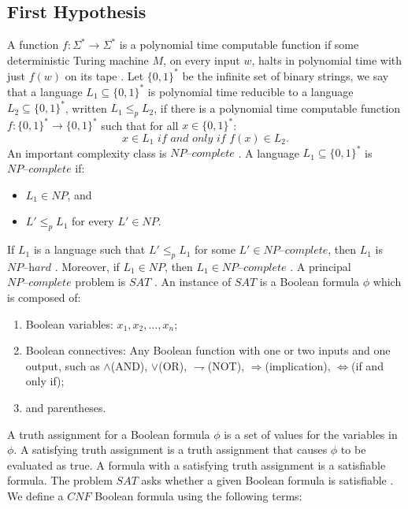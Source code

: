 \documentclass[a4paper,UKenglish,cleveref, autoref]{lipics-v2019}
\begin{document}
\subsection{First Hypothesis}

A function $f : \Sigma^{*} \rightarrow \Sigma^{*}$ is a polynomial time computable function if some deterministic Turing machine $M$, on every input $w$, halts in polynomial time with just $f(w)$ on its tape \cite{MS06}. Let $\{0, 1\}^{*}$ be the infinite set of binary strings, we say that a language $L_{1} \subseteq \{0, 1\}^{*}$ is polynomial time reducible to a language $L_{2} \subseteq \{0, 1\}^{*}$, written $L_{1} \leq_{p} L_{2}$, if there is a polynomial time computable function $f : \{0, 1\}^{*} \rightarrow \{0, 1\}^{*}$ such that for all $x \in \{0, 1\}^{*}$:
\[x \in L_{1} \textit{ if and only if } f(x) \in L_{2}.\]
An important complexity class is $\textit{NP--complete}$ \cite{GJ79}. A language $L_{1} \subseteq \{0, 1\}^{*}$ is $\textit{NP--complete}$ if:

\begin{itemize}
\item $L_{1} \in NP$, and
\item $L' \leq_{p} L_{1}$ for every $L' \in NP$.
\end{itemize}

If $L_{1}$ is a language such that $L' \leq_{p} L_{1}$ for some $L' \in \textit{NP--complete}$, then $L_{1}$ is $\textit{NP--hard}$ \cite{CLRS01}. Moreover, if $L_{1} \in NP$, then $L_{1} \in \textit{NP--complete}$ \cite{CLRS01}. A principal $\textit{NP--complete}$ problem is $SAT$ \cite{GJ79}. An instance of $SAT$ is a Boolean formula $\phi$ which is composed of:

\begin{enumerate}
\item Boolean variables: $x_{1}, x_{2},\ldots, x_{n}$;
\item Boolean connectives: Any Boolean function with one or two inputs and one output, such as $\wedge$(AND), $\vee$(OR), $\rightharpoondown$(NOT), $\Rightarrow$(implication), $\Leftrightarrow$(if and only if);
\item and parentheses.
\end{enumerate}

A truth assignment for a Boolean formula $\phi$ is a set of values for the variables in $\phi$. A satisfying truth assignment is a truth assignment that causes $\phi$ to be evaluated as true. A formula with a satisfying truth assignment is a satisfiable formula. The problem $SAT$ asks whether a given Boolean formula is satisfiable \cite{GJ79}. We define a $CNF$ Boolean formula using the following terms:
\end{document}
